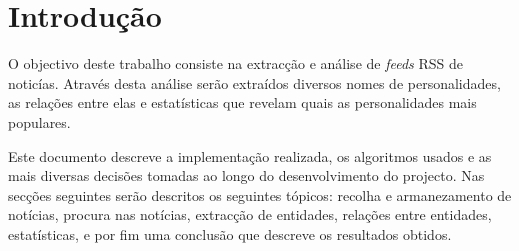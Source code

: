 \section{Introdução}
O objectivo deste trabalho consiste na extracção e análise de \textit{feeds} RSS de noticías. Através desta análise serão extraídos diversos nomes de personalidades, as relações entre elas e estatísticas que revelam quais as personalidades mais populares.

Este documento descreve a implementação realizada, os algoritmos usados e as mais diversas decisões tomadas ao longo do desenvolvimento do projecto. Nas secções seguintes serão descritos os seguintes tópicos: recolha e armanezamento de notícias, procura nas notícias, extracção de entidades, relações entre entidades, estatísticas, e por fim uma conclusão que descreve os resultados obtidos.